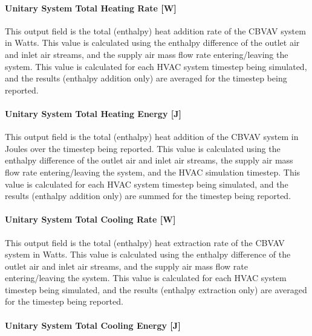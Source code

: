 \paragraph{Unitary System Total Heating Rate {[}W{]}}\label{unitary-system-total-heating-rate-w-2}

This output field is the total (enthalpy) heat addition rate of the CBVAV system in Watts. This value is calculated using the enthalpy difference of the outlet air and inlet air streams, and the supply air mass flow rate entering/leaving the system. This value is calculated for each HVAC system timestep being simulated, and the results (enthalpy addition only) are averaged for the timestep being reported.

\paragraph{Unitary System Total Heating Energy {[}J{]}}\label{unitary-system-total-heating-energy-j}

This output field is the total (enthalpy) heat addition of the CBVAV system in Joules over the timestep being reported. This value is calculated using the enthalpy difference of the outlet air and inlet air streams, the supply air mass flow rate entering/leaving the system, and the HVAC simulation timestep. This value is calculated for each HVAC system timestep being simulated, and the results (enthalpy addition only) are summed for the timestep being reported.

\paragraph{Unitary System Total Cooling Rate {[}W{]}}\label{unitary-system-total-cooling-rate-w-2}

This output field is the total (enthalpy) heat extraction rate of the CBVAV system in Watts. This value is calculated using the enthalpy difference of the outlet air and inlet air streams, and the supply air mass flow rate entering/leaving the system. This value is calculated for each HVAC system timestep being simulated, and the results (enthalpy extraction only) are averaged for the timestep being reported.

\paragraph{Unitary System Total Cooling Energy {[}J{]}}\label{unitary-system-total-cooling-energy-j}

